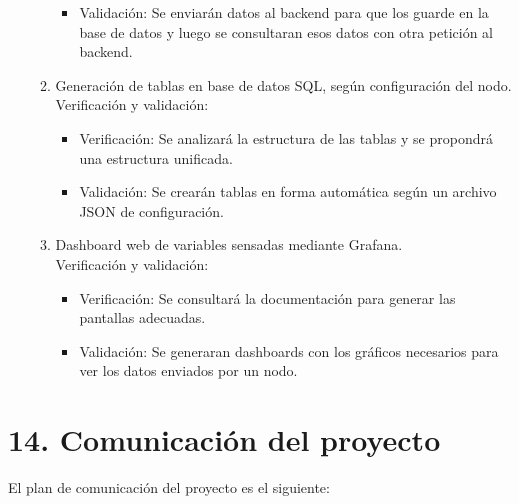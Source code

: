 \documentclass[11pt]{charter}
\begin{document}
\begin{enumerate}
\begin{enumerate}
\begin{itemize}
		\item Validación: Se enviarán datos al backend para que los guarde en la base de datos y luego se consultaran esos datos con otra petición al backend.
		\end{itemize}
	\item Generación de tablas en base de datos SQL, según configuración del nodo.
		\\Verificación y validación:
		\begin{itemize}
		\item Verificación: Se analizará la estructura de las tablas y se propondrá una estructura unificada.
		\item Validación: Se crearán tablas en forma automática según un archivo JSON de configuración.
		\end{itemize}
	\item Dashboard web de variables sensadas mediante Grafana.
		\\Verificación y validación:
		\begin{itemize}
		\item Verificación: Se consultará la documentación para generar las pantallas adecuadas.
		\item Validación: Se generaran dashboards con los gráficos necesarios para ver los datos enviados por un nodo.
		\end{itemize}
	\end{enumerate}
\end{enumerate}

\section{14. Comunicación del proyecto}
\label{sec:comunicaciones}

El plan de comunicación del proyecto es el siguiente:
\end{document}
